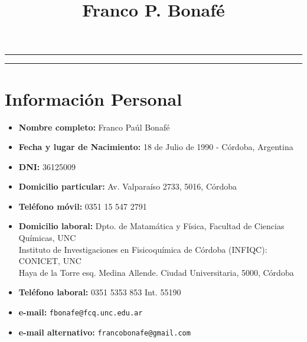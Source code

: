 \documentclass[10pt]{article}
\title{\bfseries\Huge 	Franco P. Bonafé}
\author{}
\date{}
\begin{document}
\hrule
\vspace{.25cm}
\begin{minipage}{0.65\textwidth}
\begingroup
\let\center\flushleft
\let\endcenter\endflushleft
\raggedleft{\maketitle}
\endgroup
\end{minipage}
\begin{minipage}{0.3\textwidth}
\end{minipage}
\vspace{.25cm}
\hrule

\section{Información Personal}
\begin{itemize}
 \item {\bf Nombre completo:} Franco Paúl Bonafé
\item {\bf Fecha y lugar de Nacimiento:} 18 de Julio de 1990 - Córdoba, Argentina
\item {\bf DNI:} 36125009
 \item {\bf Domicilio particular:} Av. Valparaíso 2733, 5016, C\'ordoba
 \item {\bf Teléfono móvil:} 0351 15 547 2791
 \item {\bf Domicilio laboral:}  Dpto. de Matamática y Física, Facultad de Ciencias Químicas, UNC \\
 Instituto de Investigaciones en Fisicoquímica de Córdoba (INFIQC): CONICET, UNC \\
 Haya de la Torre esq. Medina Allende.
 Ciudad Universitaria, 5000, Córdoba
\item {\bf Teléfono laboral:} 0351 5353 853 Int. 55190
\item {\bf e-mail:} \texttt{fbonafe@fcq.unc.edu.ar} 
\item {\bf e-mail alternativo:} \texttt{francobonafe@gmail.com}
\end{itemize}
\end{document}
